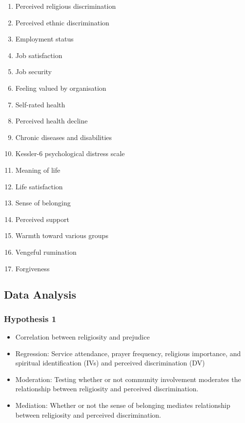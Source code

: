 \documentclass[
]{interact}
\providecommand{\tightlist}{%
  \setlength{\itemsep}{0pt}\setlength{\parskip}{0pt}}\usepackage{longtable,booktabs,array}
\begin{document}
\begin{enumerate}
\def\labelenumi{\arabic{enumi}.}
\tightlist
\item
  Perceived religious discrimination
\item
  Perceived ethnic discrimination
\item
  Employment status
\item
  Job satisfaction
\item
  Job security
\item
  Feeling valued by organisation
\item
  Self-rated health
\item
  Perceived health decline
\item
  Chronic diseases and disabilities
\item
  Kessler-6 psychological distress scale
\item
  Meaning of life
\item
  Life satisfaction
\item
  Sense of belonging
\item
  Perceived support
\item
  Warmth toward various groups
\item
  Vengeful rumination
\item
  Forgiveness
\end{enumerate}

\subsection{Data Analysis}\label{data-analysis}

\subsubsection{Hypothesis 1}\label{hypothesis-1}

\begin{itemize}
\tightlist
\item
  Correlation between religiosity and prejudice
\item
  Regression: Service attendance, prayer frequency, religious
  importance, and spiritual identification (IVs) and perceived
  discrimination (DV)
\item
  Moderation: Testing whether or not community involvement moderates the
  relationship between religiosity and perceived discrimination.
\item
  Mediation: Whether or not the sense of belonging mediates relationship
  between religiosity and perceived discrimination.
\end{itemize}
\end{document}

